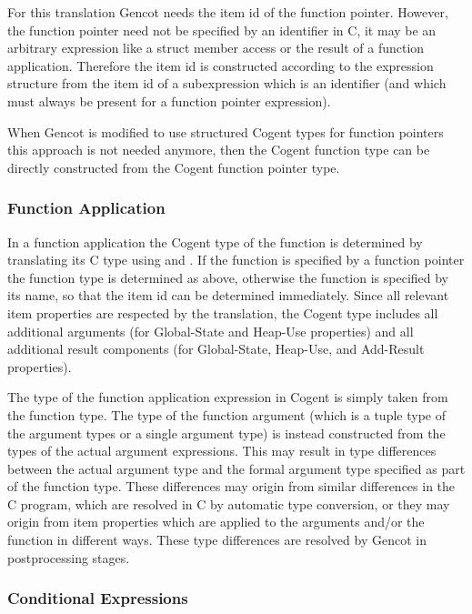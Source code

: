For this translation Gencot needs the item id of the function pointer. However, the function pointer need not be specified
by an identifier in C, it may be an arbitrary expression like a struct member access or the result of a function application.
Therefore the item id is constructed according to the expression structure from the item id of a subexpression which is
an identifier (and which must always be present for a function pointer expression).

When Gencot is modified to use structured Cogent types for function pointers this approach is not needed anymore, then
the Cogent function type can be directly constructed from the Cogent function pointer type.

\subsubsection{Function Application}

In a function application the Cogent type of the function is determined by translating its C type using  and
. If the function is specified by a function pointer the function type is determined as above, otherwise
the function is specified by its name, so that the item id can be determined immediately. Since all relevant item properties
are respected by the translation, the Cogent type includes all additional arguments (for Global-State and Heap-Use properties)
and all additional result components (for Global-State, Heap-Use, and Add-Result properties).

The type of the function application expression in Cogent is simply taken from the function type. The type of the function
argument (which is a tuple type of the argument types or a single argument type) is instead constructed from the types
of the actual argument expressions. This may result in type differences between the actual argument type and the formal
argument type specified as part of the function type. These differences may origin from similar differences in the C program,
which are resolved in C by automatic type conversion, or they may origin from item properties which are applied to the
arguments and/or the function in different ways. These type differences are resolved by Gencot in postprocessing stages.

\subsubsection{Conditional Expressions}

